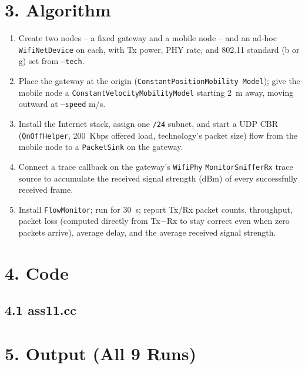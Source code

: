 \documentclass[11pt]{article}
\begin{document}
\section*{3. Algorithm}
\begin{enumerate}
  \item Create two nodes -- a fixed gateway and a mobile node -- and an
        ad-hoc \texttt{WifiNetDevice} on each, with Tx power, PHY rate, and
        802.11 standard (b or g) set from \texttt{--tech}.
  \item Place the gateway at the origin (\texttt{ConstantPositionMobility
        Model}); give the mobile node a \texttt{ConstantVelocityMobilityModel}
        starting 2~m away, moving outward at \texttt{--speed} m/s.
  \item Install the Internet stack, assign one \texttt{/24} subnet, and start
        a UDP CBR (\texttt{OnOffHelper}, 200~Kbps offered load, technology's
        packet size) flow from the mobile node to a \texttt{PacketSink} on
        the gateway.
  \item Connect a trace callback on the gateway's \texttt{WifiPhy}
        \texttt{MonitorSnifferRx} trace source to accumulate the received
        signal strength (dBm) of every successfully received frame.
  \item Install \texttt{FlowMonitor}; run for 30~s; report Tx/Rx packet
        counts, throughput, packet loss (computed directly from Tx$-$Rx to
        stay correct even when zero packets arrive), average delay, and the
        average received signal strength.
\end{enumerate}

\section*{4. Code}
\subsection*{4.1 ass11.cc}


\section*{5. Output (All 9 Runs)}

\end{document}
